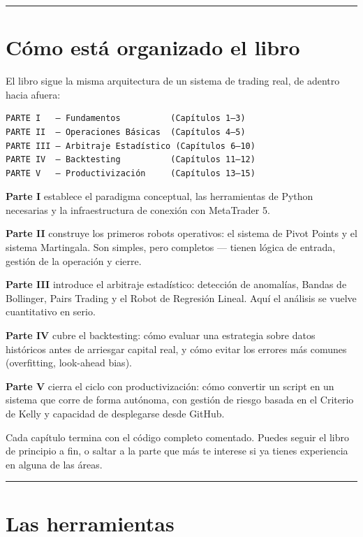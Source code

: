 \documentclass[12pt, a4paper, twoside, openright]{book}
\numberwithin{figure}{chapter}
\numberwithin{table}{chapter}
\begin{document}
\begin{center}\rule{0.5\linewidth}{0.5pt}\end{center}

\section{Cómo está organizado el
libro}\label{cuxf3mo-estuxe1-organizado-el-libro}

El libro sigue la misma arquitectura de un sistema de trading real, de
adentro hacia afuera:

\begin{verbatim}
PARTE I   — Fundamentos          (Capítulos 1–3)
PARTE II  — Operaciones Básicas  (Capítulos 4–5)
PARTE III — Arbitraje Estadístico (Capítulos 6–10)
PARTE IV  — Backtesting          (Capítulos 11–12)
PARTE V   — Productivización     (Capítulos 13–15)
\end{verbatim}

\textbf{Parte I} establece el paradigma conceptual, las herramientas de
Python necesarias y la infraestructura de conexión con MetaTrader 5.

\textbf{Parte II} construye los primeros robots operativos: el sistema
de Pivot Points y el sistema Martingala. Son simples, pero completos ---
tienen lógica de entrada, gestión de la operación y cierre.

\textbf{Parte III} introduce el arbitraje estadístico: detección de
anomalías, Bandas de Bollinger, Pairs Trading y el Robot de Regresión
Lineal. Aquí el análisis se vuelve cuantitativo en serio.

\textbf{Parte IV} cubre el backtesting: cómo evaluar una estrategia
sobre datos históricos antes de arriesgar capital real, y cómo evitar
los errores más comunes (overfitting, look-ahead bias).

\textbf{Parte V} cierra el ciclo con productivización: cómo convertir un
script en un sistema que corre de forma autónoma, con gestión de riesgo
basada en el Criterio de Kelly y capacidad de desplegarse desde GitHub.

Cada capítulo termina con el código completo comentado. Puedes seguir el
libro de principio a fin, o saltar a la parte que más te interese si ya
tienes experiencia en alguna de las áreas.

\begin{center}\rule{0.5\linewidth}{0.5pt}\end{center}

\section{Las herramientas}\label{las-herramientas}
\end{document}
